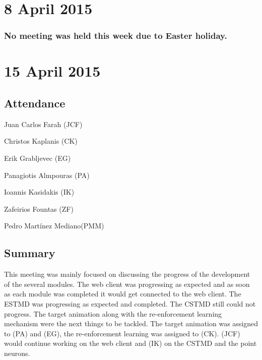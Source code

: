 \documentclass[a4paper,11pt]{article}
\begin{document}
\section*{8 April 2015}
\subsubsection*{No meeting was held this week due to Easter holiday.}

\maketitle
\section*{15 April 2015}
\subsection*{Attendance}
\begin{compactenum}
\item Juan Carlos Farah (JCF)
\item Christos Kaplanis (CK)
\item Erik Grabljevec (EG)
\item Panagiotis Almpouras (PA)
\item Ioannis Kasidakis (IK)
\item Zafeirios Fountas (ZF)
\item Pedro Martínez Mediano(PMM)
\end{compactenum}

\subsection*{Summary}
This meeting was mainly focused on discussing the progress of the development of the several modules. The web client was progressing as expected and as soon as each module was completed it would get connected to the web client. The ESTMD was progressing as expected and completed. The CSTMD still could not progress. The target animation along with the re-enforcement learning mechanism were the next things to be tackled. The target animation was assigned to (PA) and (EG), the re-enforcement learning was assigned to (CK). (JCF) would continue working on the web client and (IK) on the CSTMD and the point neurons.

\maketitle
\end{document}
